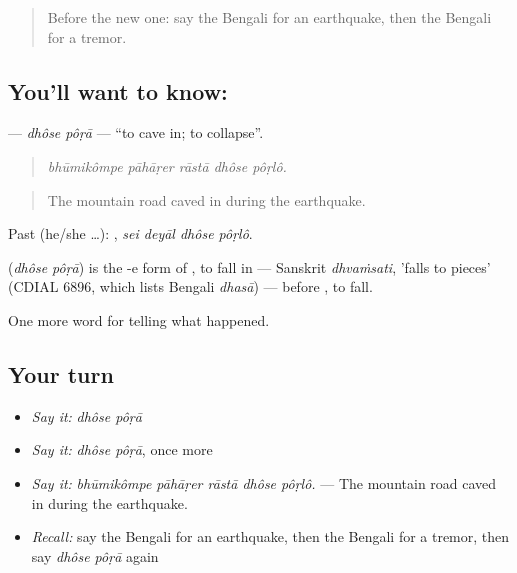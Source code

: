 \label{lesson:BN-C293-dhose-pora}



\begin{quote}
Before the new one: say the Bengali for an earthquake, then the Bengali for a tremor.
\end{quote}

\subsection*{You'll want to know:  }
\textbf{ } — \emph{dhôse pôṛā} — \textquotedblleft{}to cave in; to collapse\textquotedblright{}.

\begin{quote}
    
\end{quote}

\begin{quote}
\emph{bhūmikômpe pāhāṛer rāstā dhôse pôṛlô.}
\end{quote}

\begin{quote}
The mountain road caved in during the earthquake.
\end{quote}

Past (he/she …):    , \emph{sei deyāl dhôse pôṛlô}.

\begin{cousinweb}
\textbf{ } (\emph{dhôse pôṛā}) is the -e form of , to fall in — Sanskrit \emph{dhvaṁsati}, 'falls to pieces' (CDIAL 6896, which lists Bengali \emph{dhasā}) — before , to fall.
\end{cousinweb}

\begin{grammarlens}[title={What you've built}]
One more word for telling what happened.
\end{grammarlens}

\subsection*{Your turn}
\begin{itemize}
\raggedright
  \item \emph{Say it:} \emph{dhôse pôṛā}
  \item \emph{Say it:} \emph{dhôse pôṛā}, once more
  \item \emph{Say it:} \emph{bhūmikômpe pāhāṛer rāstā dhôse pôṛlô.} — The mountain road caved in during the earthquake.
  \item \emph{Recall:} say the Bengali for an earthquake, then the Bengali for a tremor, then say \emph{dhôse pôṛā} again
\end{itemize}

